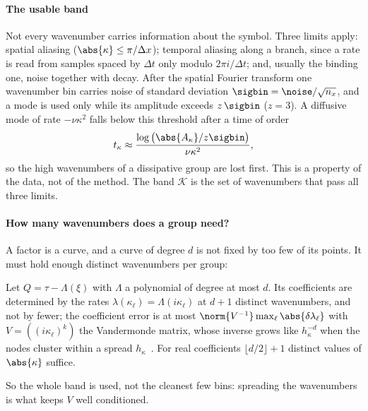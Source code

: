 \paragraph{The usable band} Not every wavenumber carries information about the symbol. Three limits apply: spatial
aliasing ($\abs{\kappa}\le\pi/\Delta x$); temporal aliasing along a branch, since a rate is read from samples spaced by
$\Delta t$ only modulo $2\pi i/\Delta t$; and, usually the binding one, noise together with decay. After the spatial Fourier
transform one wavenumber bin carries noise of standard deviation $\sigbin=\noise/\sqrt{n_x}$, and a mode is used only
while its amplitude exceeds $z\,\sigbin$ ($z=3$). A diffusive mode of rate $-\nu\kappa^2$ falls below this threshold after
a time of order
\[
  t_\kappa\approx\frac{\log\big(\abs{A_\kappa}/z\sigbin\big)}{\nu\kappa^2},
\]
so the high wavenumbers of a dissipative group are lost
first. This is a property of the data, not of the method. The band $\mathcal K$ is the set of wavenumbers that pass all
three limits. 

\paragraph{How many wavenumbers does a group need?} A factor is a curve, and a curve of degree $d$ is not fixed by too
few of its points. It must hold enough distinct wavenumbers per group:

\begin{proposition}\label{prop:counting}
Let $Q=\tau-\Lambda(\xi)$ with $\Lambda$ a polynomial of degree at most $d$. Its coefficients are determined by the rates
$\lambda(\kappa_\ell)=\Lambda(i\kappa_\ell)$ at $d+1$ distinct wavenumbers, and not by fewer; the coefficient error is at
most $\norm{V^{-1}}\max_\ell\abs{\delta\lambda_\ell}$ with $V=((i\kappa_\ell)^k)$ the Vandermonde matrix, whose inverse grows
like $h_\kappa^{-d}$ when the nodes cluster within a spread $h_\kappa$~\cite{Gau62}. For real coefficients
$\lfloor d/2\rfloor+1$ distinct values of $\abs{\kappa}$ suffice.
\end{proposition}

So the whole band is used, not the cleanest few bins: spreading the wavenumbers is what keeps $V$ well conditioned.

